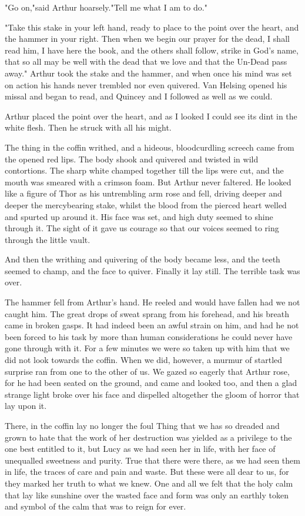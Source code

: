 "Go on,"said Arthur hoarsely."Tell me what I am to do." 

"Take this stake in your left hand, ready to place to the point over the heart, and the hammer in your right. Then when we begin our prayer for the dead, I shall read him, I have here the book, and the others shall follow, strike in God's name, that so all may be well with the dead that we love and that the Un-Dead pass away." Arthur took the stake and the hammer, and when once his mind was set on action his hands never trembled nor even quivered. Van Helsing opened his missal and began to read, and Quincey and I followed as well as we could. 

Arthur placed the point over the heart, and as I looked I could see its dint in the white flesh. Then he struck with all his might. 

The thing in the coffin writhed, and a hideous, bloodcurdling screech came from the opened red lips. The body shook and quivered and twisted in wild contortions. The sharp white champed together till the lips were cut, and the mouth was smeared with a crimson foam. But Arthur never faltered. He looked like a figure of Thor as his untrembling arm rose and fell, driving deeper and deeper the mercybearing stake, whilst the blood from the pierced heart welled and spurted up around it. His face was set, and high duty seemed to shine through it. The sight of it gave us courage so that our voices seemed to ring through the little vault. 

And then the writhing and quivering of the body became less, and the teeth seemed to champ, and the face to quiver. Finally it lay still. The terrible task was over. 

The hammer fell from Arthur's hand. He reeled and would have fallen had we not caught him. The great drops of sweat sprang from his forehead, and his breath came in broken gasps. It had indeed been an awful strain on him, and had he not been forced to his task by more than human considerations he could never have gone through with it. For a few minutes we were so taken up with him that we did not look towards the coffin. When we did, however, a murmur of startled surprise ran from one to the other of us. We gazed so eagerly that Arthur rose, for he had been seated on the ground, and came and looked too, and then a glad strange light broke over his face and dispelled altogether the gloom of horror that lay upon it. 

There, in the coffin lay no longer the foul Thing that we has so dreaded and grown to hate that the work of her destruction was yielded as a privilege to the one best entitled to it, but Lucy as we had seen her in life, with her face of unequalled sweetness and purity. True that there were there, as we had seen them in life, the traces of care and pain and waste. But these were all dear to us, for they marked her truth to what we knew. One and all we felt that the holy calm that lay like sunshine over the wasted face and form was only an earthly token and symbol of the calm that was to reign for ever. 

